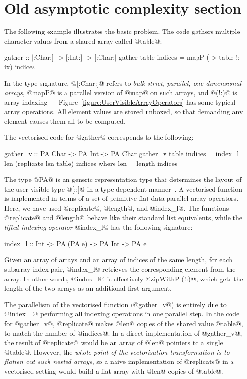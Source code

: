 \clearpage{}
\section{Old asymptotic complexity section}
The following example illustrates the basic problem. The code gathers multiple character values from a shared array called @table@:
%
\begin{code}
  gather :: [:Char:] -> [:Int:] -> [:Char:]
  gather table indices
   = mapP (\ix -> table !: ix) indices
\end{code}
%
In the type signature, @[:Char:]@ refers to \emph{bulk-strict, parallel, one-dimensional arrays}, @mapP@ is a parallel version of @map@ on such arrays, and @(!:)@ is array indexing --- Figure~\ref{figure:UserVisibleArrayOperators} has some typical array operations. All element values are stored unboxed, so that demanding any element causes them all to be computed. 

The vectorised code for @gather@ corresponds to the following:
\begin{code}
 gather_v :: PA Char -> PA Int -> PA Char
 gather_v table indices
  = index_l len (replicate len table) indices
  where len = length indices
\end{code}
%
The type @PA@ is an generic representation type that determines the layout of the user-visible type @[::]@ in a type-dependent manner~\cite{chak-etal:DPH}. A vectorised function is implemented in terms of a set of primitive flat data-parallel array operators. Here, we have used @replicate@, @length@, and @index_l@. The functions @replicate@ and @length@ behave like their standard list equivalents, while the \emph{lifted indexing operator} @index_l@ has the following signature:
%
\begin{code}
 index_l :: Int -> PA (PA e) -> PA Int -> PA e
\end{code}
%
Given an array of arrays and an array of indices of the same length, for each subarray-index pair, @index_l@ retrieves the corresponding element from the array. In other words, @index_l@ is effectively @zipWithP (!:)@, which gets the length of the two arrays as an additional first argument.

The parallelism of the vectorised function (@gather_v@) is entirely due to @index_l@ performing all indexing operations in one parallel step.  In the code for @gather_v@, @replicate@ makes @len@ copies of the shared value @table@, to match the number of @indices@. In a direct implementation of @gather_v@, the result of @replicate@ would be an array of @len@ pointers to a single @table@.  However, the \emph{whole point of the vectorisation transformation is to flatten out such nested arrays}, so a naive implementation of @replicate@ in a vectorised setting would build a flat array with @len@ copies of @table@. 

